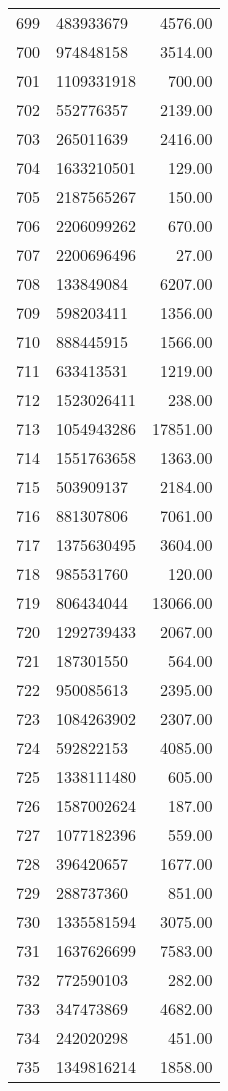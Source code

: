 \begin{table}[ht]
\begin{tabular}{rlr}
  699 & 483933679 & 4576.00 \\ 
  700 & 974848158 & 3514.00 \\ 
  701 & 1109331918 & 700.00 \\ 
  702 & 552776357 & 2139.00 \\ 
  703 & 265011639 & 2416.00 \\ 
  704 & 1633210501 & 129.00 \\ 
  705 & 2187565267 & 150.00 \\ 
  706 & 2206099262 & 670.00 \\ 
  707 & 2200696496 & 27.00 \\ 
  708 & 133849084 & 6207.00 \\ 
  709 & 598203411 & 1356.00 \\ 
  710 & 888445915 & 1566.00 \\ 
  711 & 633413531 & 1219.00 \\ 
  712 & 1523026411 & 238.00 \\ 
  713 & 1054943286 & 17851.00 \\ 
  714 & 1551763658 & 1363.00 \\ 
  715 & 503909137 & 2184.00 \\ 
  716 & 881307806 & 7061.00 \\ 
  717 & 1375630495 & 3604.00 \\ 
  718 & 985531760 & 120.00 \\ 
  719 & 806434044 & 13066.00 \\ 
  720 & 1292739433 & 2067.00 \\ 
  721 & 187301550 & 564.00 \\ 
  722 & 950085613 & 2395.00 \\ 
  723 & 1084263902 & 2307.00 \\ 
  724 & 592822153 & 4085.00 \\ 
  725 & 1338111480 & 605.00 \\ 
  726 & 1587002624 & 187.00 \\ 
  727 & 1077182396 & 559.00 \\ 
  728 & 396420657 & 1677.00 \\ 
  729 & 288737360 & 851.00 \\ 
  730 & 1335581594 & 3075.00 \\ 
  731 & 1637626699 & 7583.00 \\ 
  732 & 772590103 & 282.00 \\ 
  733 & 347473869 & 4682.00 \\ 
  734 & 242020298 & 451.00 \\ 
  735 & 1349816214 & 1858.00 \\ 

\end{tabular}
\end{table}
